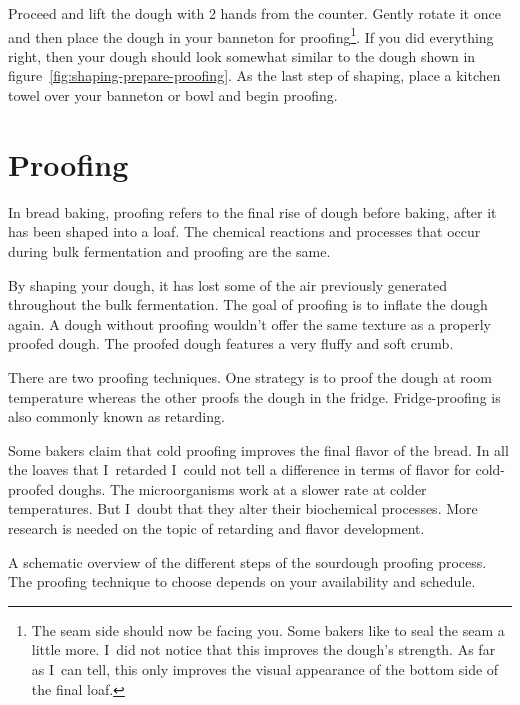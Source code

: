 Proceed and lift the dough with 2 hands from the counter.
Gently rotate it once and then place the dough in your
banneton for proofing\footnote{The seam side should now be facing you.
Some bakers like to seal the seam a little more. I~did
not notice that this improves the dough's strength. As far as I~can
tell, this only improves the visual appearance of the bottom side
of the final loaf.}. If you did everything right, then your
dough should look somewhat similar to the dough shown in figure~\ref{fig:shaping-prepare-proofing}.
As the last step of shaping, place a kitchen towel over your banneton
or bowl and begin proofing.

\section{Proofing}

In bread baking, proofing refers to the final rise of dough before baking,
after it has been shaped into a loaf. The chemical reactions and processes
that occur during bulk fermentation and proofing are the same.

By shaping your dough, it has lost some of the air previously generated
throughout the bulk fermentation. The goal of proofing is to inflate
the dough again. A dough without proofing wouldn't offer the same texture
as a properly proofed dough. The proofed dough features a very fluffy
and soft crumb.

There are two proofing techniques. One strategy is to proof the dough
at room temperature whereas the other proofs the dough in the fridge.
Fridge-proofing is also commonly known as retarding.

Some bakers claim that cold proofing improves the final flavor of the bread.
In all the loaves that I~retarded I~could not tell a difference
in terms of flavor for cold-proofed doughs. The microorganisms work
at a slower rate at colder temperatures. But I~doubt that they alter
their biochemical processes. More research is needed on the topic
of retarding and flavor development.

\begin{flowchart}[!htb]
\begin{center}
  
  \caption[Sourdough proofing process]{A schematic overview of the different steps of
      the sourdough proofing process. The proofing technique to choose depends
      on your availability and schedule.}%
  \label{fig:proofing-process}
\end{center}
\end{flowchart}

